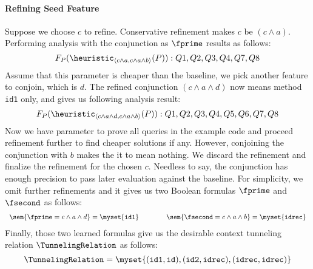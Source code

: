 \paragraph{Refining Seed Feature} Suppose we choose $c$ to refine. Conservative refinement makes $c$ be $(c \land a)$. Performing analysis with the conjunction as $\fprime$ results as follows:
\[
F_P(\heuristic_{\langle c \land a, c \land a \land b \rangle}(P)) : Q1, Q2, Q3, Q4, Q7, Q8
\]
Assume that this parameter is cheaper than the baseline, we pick another feature to conjoin, which is $d$. The refined conjunction $(c \land a \land d)$ now means method \texttt{id1} only, and gives us following analysis result:
\[
F_P(\heuristic_{\langle c \land a \land d, c \land a \land b \rangle}(P)) : Q1, Q2, Q3, Q4, Q5, Q6, Q7, Q8
\]
Now we have parameter to prove all queries in the example code and proceed refinement further to find cheaper solutions if any. However, conjoining the conjunction with $b$ makes the it to mean nothing. We discard the refinement and finalize the refinement for the chosen $c$. Needless to say, the conjunction has enough precision to pass later evaluation against the baseline. For simplicity, we omit further refinements and it gives us two Boolean formulas $\fprime$ and $\fsecond$ as follows:
\[
\begin{array}{c c c}
\sem{\fprime = c \land a \land d} = \myset{\texttt{id1}} &\quad\quad& \sem{\fsecond = c \land a \land b} = \myset{\texttt{idrec}}
\end{array}
\]
Finally, those two learned formulas give us the desirable context tunneling relation $\TunnelingRelation$ as follows:
\[
\TunnelingRelation=\myset{({\tt id1}, {\tt id}), ({\tt id2}, {\tt idrec}), ({\tt idrec}, {\tt idrec})}
\]